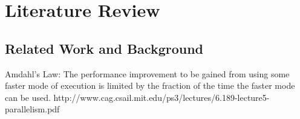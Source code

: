 \chapter{Literature Review}\label{ch:literature_review}

\section{Related Work and Background} %
\label{sec:related_work_and_background}






Amdahl's Law: The performance improvement to be gained from using some faster
mode of execution is limited by the fraction of the time the faster mode can be
used.
http://www.cag.csail.mit.edu/ps3/lectures/6.189-lecture5-parallelism.pdf


